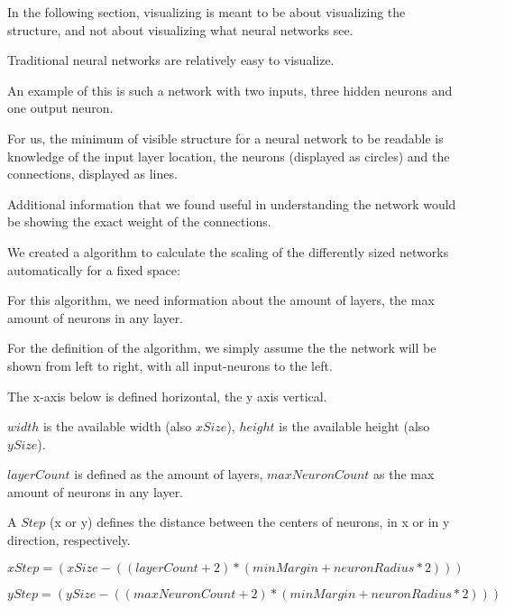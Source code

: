 In the following section, visualizing is meant to be about visualizing the structure, and not about visualizing what neural networks see.\cite{deepnetworkvisualizing2015}

Traditional neural networks are relatively easy to visualize.

An example of this is such a network with two inputs, three hidden neurons and one output neuron.

{\centering
	\begin{neuralnetwork}[height=3, nodespacing=1.5cm]
		\newcommand{\nodelabel}[2]{
			\ifnum#1=0 $x_#2$ \fi
			\ifnum#1=1 $y_#2$ \fi
			\ifnum#1=2 $z_#2$ \fi
		}
		\setdefaultnodetext{\nodelabel}
		\hiddenlayer[count=3, bias=false, title=] \linklayers
		\outputlayer[count=1, title=] \linklayers
	\end{neuralnetwork}
	\par}

For us, the minimum of visible structure for a neural network to be readable is knowledge of the input layer location, the neurons (displayed as circles) and the connections, displayed as lines.

Additional information that we found useful in understanding the network would be showing the exact weight of the connections.

We created a algorithm to calculate the scaling of the differently sized networks automatically for a fixed space:

For this algorithm, we need information about the amount of layers, the max amount of neurons in any layer.

For the definition of the algorithm, we simply assume the the network will be shown from left to right, with all input-neurons to the left.

The x-axis below is defined horizontal, the y axis vertical.

$ width $ is the available width (also $ xSize $), $ height $ is the available height (also $ ySize $).

$ layerCount $ is defined as the amount of layers, $ maxNeuronCount $ as the max amount of neurons in any layer.

A $ Step $ (x or y) defines the distance between the centers of neurons, in x or in y direction, respectively.

$$ xStep = (xSize - ((layerCount + 2) * (minMargin + neuronRadius * 2))) $$

$$ yStep = (ySize - ((maxNeuronCount + 2) * (minMargin + neuronRadius * 2))) $$

